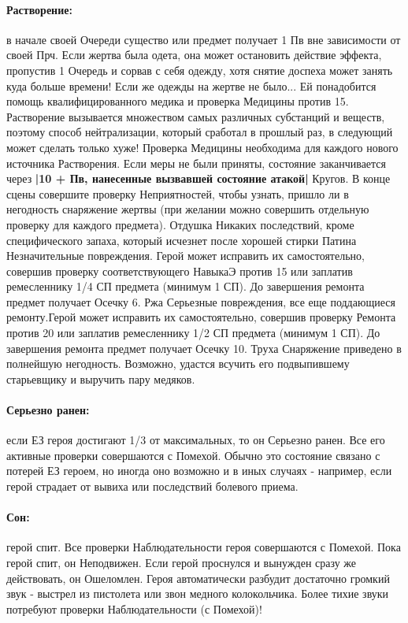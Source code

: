 \paragraph{Растворение:} в начале своей Очереди существо или предмет получает 1 Пв вне зависимости от своей Прч. Если жертва была одета, она может остановить действие эффекта, пропустив 1 Очередь и сорвав с себя одежду, хотя снятие доспеха может занять куда больше времени! Если же одежды на жертве не было... Ей понадобится помощь квалифицированного медика и проверка Медицины против 15. Растворение вызывается множеством самых различных субстанций и веществ, поэтому способ нейтрализации, который сработал в прошлый раз, в следующий может сделать только хуже! Проверка Медицины необходима для каждого нового источника Растворения.
\newline
Если меры не были приняты, состояние заканчивается через \textbf{|10 + Пв, нанесенные вызвавшей состояние атакой|} Кругов. В конце сцены совершите проверку Неприятностей, чтобы узнать, пришло ли в негодность снаряжение жертвы (при желании можно совершить отдельную проверку для каждого предмета).
\trouble
{Отдушка}%
{Никаких последствий, кроме специфического запаха, который исчезнет после хорошей стирки}%
{Патина}%
{Незначительные повреждения. Герой может исправить их самостоятельно, совершив проверку соответствующего НавыкаЭ против 15 или заплатив ремесленнику 1/4 СП предмета (минимум 1 СП). До завершения ремонта предмет получает Осечку 6.}%
{Ржа}%
{Серьезные повреждения, все еще поддающиеся ремонту.Герой может исправить их самостоятельно, совершив проверку Ремонта против 20 или заплатив ремесленнику 1/2 СП предмета (минимум 1 СП). До завершения ремонта предмет получает Осечку 10.}%
{Труха}%
{Снаряжение приведено в полнейшую негодность. Возможно, удастся всучить его подвыпившему старьевщику и выручить пару медяков.}%
\paragraph{Серьезно ранен:} если ЕЗ героя достигают 1/3 от максимальных, то он Серьезно ранен. Все его активные проверки совершаются с Помехой. Обычно это состояние связано с потерей ЕЗ героем, но иногда оно возможно и в иных случаях - например, если герой страдает от вывиха или последствий болевого приема.
\paragraph{Сон:} герой спит. Все проверки Наблюдательности героя совершаются с Помехой. Пока герой спит, он Неподвижен. Если герой проснулся и вынужден сразу же действовать, он Ошеломлен. Героя автоматически разбудит достаточно громкий звук - выстрел из пистолета или звон медного колокольчика. Более тихие звуки потребуют проверки Наблюдательности (с Помехой)!

